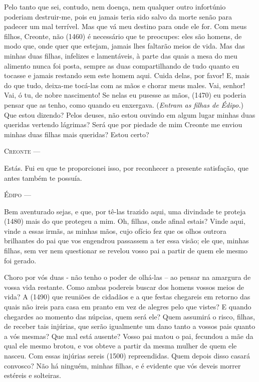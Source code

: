 Pelo tanto que sei, contudo, nem doença, nem qualquer outro infortúnio
poderiam destruir-me, pois eu jamais teria sido salvo da morte senão
para padecer um mal terrível. Mas que vá meu destino para onde ele for.
Com meus filhos, Creonte, não (1460) é necessário que te preocupes: eles
são homens, de modo que, onde quer que estejam, jamais lhes faltarão
meios de vida. Mas das minhas duas filhas, infelizes e lamentáveis, à
parte das quais a mesa do meu alimento nunca foi posta, sempre as duas
compartilhando de tudo quanto eu tocasse e jamais restando sem este
homem aqui. Cuida delas, por favor! E, mais do que tudo, deixa-me
tocá-las com as mãos e chorar meus males. Vai, senhor! Vai, ó tu, de
nobre nascimento! Se nelas eu pusesse as mãos, (1470) eu poderia pensar
que as tenho, como quando eu enxergava. (\emph{Entram as filhas de
Édipo.}) Que estou dizendo? Pelos deuses, não estou ouvindo em algum
lugar minhas duas queridas vertendo lágrimas? Será que por piedade de
mim Creonte me enviou minhas duas filhas mais queridas? Estou certo?

\textsc{Creonte} ---

Estás. Fui eu que te proporcionei isso, por reconhecer a presente
satisfação, que antes também te possuía.

\textsc{Édipo} ---

Bem aventurado sejas, e que, por tê-las trazido aqui, uma divindade te
proteja (1480) mais do que protegeu a mim. Oh, filhas, onde afinal
estais? Vinde aqui, vinde a essas irmãs, as minhas mãos, cujo ofício fez
que os olhos outrora brilhantes do pai que vos engendrou passassem a ter
essa visão; ele que, minhas filhas, sem ver nem questionar se revelou
vosso pai a partir de quem ele mesmo foi gerado.

Choro por vós duas - não tenho o poder de olhá-las -- ao pensar na
amargura de vossa vida restante. Como ambas podereis buscar dos homens
vossos meios de vida? A (1490) que reuniões de cidadãos e a que festas
chegareis em retorno das quais não ireis para casa em pranto em vez de
alegres pelo que vistes? E quando chegardes ao momento das núpcias, quem
será ele? Quem assumirá o risco, filhas, de receber tais injúrias, que
serão igualmente um dano tanto a vossos pais quanto a vós mesmas? Que
mal está ausente? Vosso pai matou o pai, fecundou a mãe da qual ele
mesmo brotou, e vos obteve a partir da mesma mulher de quem ele nasceu.
Com essas injúrias sereis (1500) repreendidas. Quem depois disso casará
convosco? Não há ninguém, minhas filhas, e é evidente que vós deveis
morrer estéreis e solteiras.

